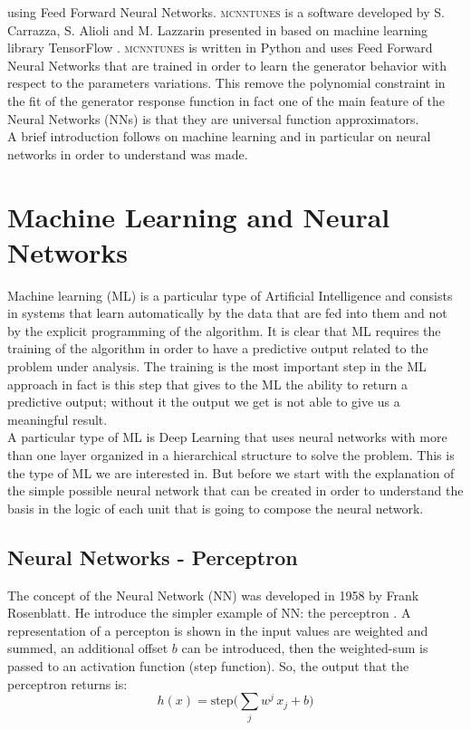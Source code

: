 using Feed Forward Neural Networks. \textsc{mcnntunes} is a software developed by S. Carrazza, S. Alioli and M. Lazzarin presented in \cite{MCNNTUNESarticle} based on machine learning library TensorFlow \cite{tensorflow2015-whitepaper}. \textsc{mcnntunes} is written in Python and uses Feed Forward Neural Networks that are trained in order to learn the generator behavior with respect to the parameters variations. This remove the polynomial constraint in the fit of the generator response function in fact one of the main feature of the Neural Networks (NNs) is that they are universal function approximators.
\\
A brief introduction follows on machine learning and in particular on neural networks in order to understand was made.

\section{Machine Learning and Neural Networks}
  
Machine learning (ML) is a particular type of Artificial Intelligence and consists in systems that learn automatically by the data that are fed into them and not by the explicit programming of the algorithm. It is clear that ML requires the training of the algorithm in order to have a predictive output related to the problem under analysis. The training is the most important step in the ML approach in fact is this step that gives to the ML the ability to return a predictive output; without it the output we get is not able to give us a meaningful result.
\\
A particular type of ML is Deep Learning that uses neural networks with more than one layer organized in a hierarchical structure to solve the problem. This is the type of ML we are interested in. But before we start with the explanation of the simple possible neural network that can be created in order to understand the basis in the logic of each unit that is going to compose the neural network. 


\subsection{Neural Networks - Perceptron}

The concept of the Neural Network (NN) was developed in 1958 by Frank Rosenblatt. He introduce the simpler example of NN: the perceptron \cite{Perceptron}. A representation of a percepton is shown in  the input values are weighted and summed, an additional offset $b$ can be introduced, then the weighted-sum is passed to an activation function (step function). So, the output that the perceptron returns is:
\begin{equation}
	h(x)= \text{step}\bigg(\displaystyle\sum_j w^j\, x_j + b\bigg)
\end{equation}

